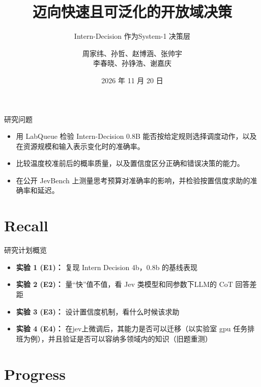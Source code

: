 \documentclass{beamer}
\title{迈向快速且可泛化的开放域决策}
\subtitle{Intern-Decision 作为System-1 决策层}
\author{周家纬、孙哲、赵博涵、张帅宇\\李春晓、孙铮浩、谢嘉庆}
\date{2026 年 11 月 20 日}
\begin{document}
\maketitle

\begin{frame}{研究问题}
\begin{itemize}
    \item 用 LabQueue 检验 Intern-Decision 0.8B 能否按给定规则选择调度动作，以及在资源规模和输入表示变化时的准确率。
    \item 比较温度校准前后的概率质量，以及置信度区分正确和错误决策的能力。
    \item 在公开 JevBench 上测量思考预算对准确率的影响，并检验按置信度求助的准确率和延迟。
\end{itemize}
\end{frame}

\section{Recall}

\begin{frame}{研究计划概览}
\begin{itemize}
    \item \textbf{实验 1 (E1)：} 复现 Intern Decision 4b，0.8b 的基线表现
    \item \textbf{实验 2 (E2)：} 量“快”值不值，看 Jev 类模型和同参数下LLM的 CoT 回答差距
    \item \textbf{实验 3 (E3)：} 设计置信度机制，看什么时候该求助
    \item \textbf{实验 4 (E4)：} 在jev上微调后，其能力是否可以迁移（以实验室 gpu 任务排班为例），并且验证是否可以容纳多领域内的知识（旧题重测）
\end{itemize}
\end{frame}

\section{Progress}
\end{document}
